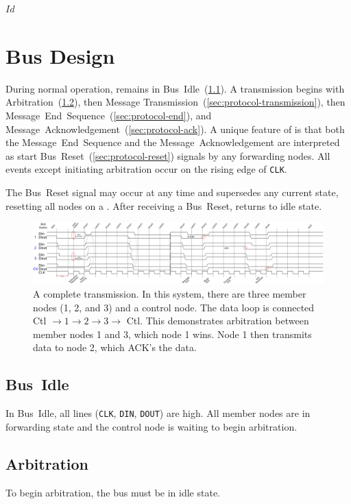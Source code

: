 \svnInfo $Id$

\section{Bus Design}
\label{sec:protocol}
During normal operation, \bus remains in Bus~Idle~(\ref{sec:protocol-idle}).
A transmission begins with Arbitration~(\ref{sec:protocol-arbitration}), then
Message Transmission~(\ref{sec:protocol-transmission}), then
Message~End~Sequence~(\ref{sec:protocol-end}),
and Message~Acknowledgement~(\ref{sec:protocol-ack}). A unique feature of \bus
is that both the Message~End~Sequence and the Message~Acknowledgement are
interpreted as start Bus~Reset~(\ref{sec:protocol-reset}) signals by any
forwarding nodes. All events except initiating arbitration occur on the rising
edge of {\tt CLK}.

The Bus~Reset signal may occur at any time and supersedes any current state,
resetting all nodes on a \bus. After receiving a Bus~Reset, \bus returns to
idle state.

\begin{figure}[h!]
\includegraphics[width=\linewidth]{img/timing}
\caption{A complete transmission. In this system, there are
three member nodes (1, 2, and 3) and a control node. The data loop is connected
Ctl $\rightarrow 1 \rightarrow 2 \rightarrow 3 \rightarrow$ Ctl. This
demonstrates arbitration between member nodes 1 and 3, which node 1 wins. Node
1 then transmits data to node 2, which ACK's the data.}
\label{fig:transmission}
\end{figure}

\subsection{Bus~Idle}
\label{sec:protocol-idle}
In \bus Bus~Idle, all lines ({\tt CLK}, {\tt DIN}, {\tt DOUT}) are high.
All member nodes are in forwarding state and the control node is waiting to
begin arbitration.

\subsection{Arbitration}
\label{sec:protocol-arbitration}
To begin arbitration, the bus must be in idle state.

